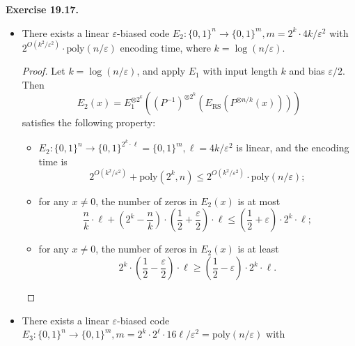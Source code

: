 \documentclass[a4paper]{article}
\newenvironment{exercise}[1]{
	\par
	\noindent\textbf{Exercise #1.}\quad
}{
	\par
	\bigskip
}
\newcommand{\pbra}[1]{\left( #1 \right)}
\newcommand{\bin}{\{0,1\}}
\newcommand{\eps}{\varepsilon}
\newcommand{\poly}{\text{poly}}
\begin{document}
\begin{exercise}{19.17}
\begin{itemize}
\begin{itemize}
\begin{proof}
$$                        \leq2e^{-2\eps^2m}<2^{-n}.
                        $$
                        Thus there exists a valid $A$ and we set $E_1(x)=Ax$. Moreover, $A$ can be found in time 
                        $$
                        \underbrace{2^{n\cdot m}}_\text{brute force $A$}\cdot\underbrace{2^n\cdot\poly(n)}_\text{check validity}.
                        $$
                        \end{proof}
                    \item There exists a linear $\eps$-biased code $E_2:\bin^n\to\bin^m,m=2^k\cdot 4k/\eps^2$ with
                        $2^{O\pbra{k^2/\eps^2}}\cdot\poly(n/\eps)$ encoding time, where $k=\log(n/\eps)$.
                        \begin{proof}
                        Let $k=\log(n/\eps)$, and apply $E_1$ with input length $k$ and bias $\eps/2$. Then 
                            $$
                            E_2(x)=E_1^{\otimes 2^k}\pbra{(P^{-1})^{\otimes 2^k}\pbra{E_\text{RS}\pbra{P^{\otimes n/k}(x)}}}
                            $$ 
                            satisfies the following property:
                            \begin{itemize}
                                \item $E_2:\bin^n\to\bin^{2^k\cdot\ell}=\bin^m,\ell=4k/\eps^2$ is linear, 
                                    and the encoding time is 
                                    $$
                                    2^{O\pbra{k^2/\eps^2}}+\poly(2^k,n)\leq2^{O\pbra{k^2/\eps^2}}\cdot\poly(n/\eps);
                                    $$
                                \item for any $x\neq0$, the number of zeros in $E_2(x)$ is at most
                                    $$
                                    \frac nk\cdot\ell+\pbra{2^k-\frac nk}\cdot\pbra{\frac12+\frac\eps2}\cdot\ell
                                    \leq\pbra{\frac12+\eps}\cdot2^k\cdot\ell;
                                    $$
                                \item for any $x\neq0$, the number of zeros in $E_2(x)$ is at least
                                    $$
                                    2^k\cdot\pbra{\frac12-\frac\eps2}\cdot\ell
                                    \geq\pbra{\frac12-\eps}\cdot2^k\cdot\ell.
                                    $$
                            \end{itemize}
                        \end{proof}
                    \item There exists a linear $\eps$-biased code $E_3:\bin^n\to\bin^m,m=2^k\cdot 2^\ell\cdot16\ell/\eps^2=\poly(n/\eps)$ with

\end{itemize}
\end{itemize}
\end{exercise}
\end{document}
